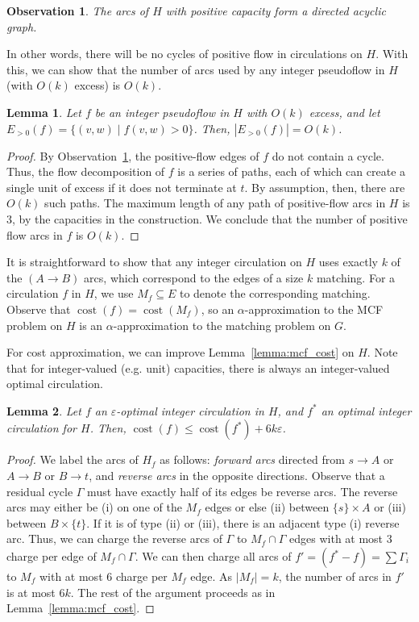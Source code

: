 \documentclass[11pt]{article}
\def\eps{\varepsilon}
\theoremstyle{plain}
\newtheorem{lemma}{Lemma}
\newtheorem{observation}{Observation}
\def\cost{\operatorname{cost}}
\begin{document}
\begin{observation}
\label{observation:dag}
	The arcs of $H$ with positive capacity form a directed acyclic graph.
\end{observation}

In other words, there will be no cycles of positive flow in circulations on
$H$.
With this, we can show that the number of arcs used by any integer pseudoflow
in $H$ (with $O(k)$ excess) is $O(k)$.

\begin{lemma}
\label{lemma:reduction_count}
Let $f$ be an integer pseudoflow in $H$ with $O(k)$ excess, and let
$E_{>0}(f) = \{(v, w) \mid f(v, w) > 0\}$.
Then, $|E_{>0}(f)| = O(k)$.
\end{lemma}

\begin{proof}
By Observation~\ref{observation:dag}, the positive-flow edges of $f$ do not
contain a cycle.
Thus, the flow decomposition of $f$ is a series of paths, each of which can
create a single unit of excess if it does not terminate at $t$.
By assumption, then, there are $O(k)$ such paths.
The maximum length of any path of positive-flow arcs in $H$ is 3, by the
capacities in the construction.
We conclude that the number of positive flow arcs in $f$ is $O(k)$.
\end{proof}

It is straightforward to show that any integer circulation on $H$ uses exactly
$k$ of the $(A \to B)$ arcs, which correspond to the edges of a size $k$
matching.
For a circulation $f$ in $H$, we use $M_f \subseteq E$ to denote the
corresponding matching.
Observe that $\cost(f) = \cost(M_f)$, so an $\alpha$-approximation to the MCF
problem on $H$ is an $\alpha$-approximation to the matching problem on $G$.

For cost approximation, we can improve Lemma~\ref{lemma:mcf_cost} on $H$.
Note that for integer-valued (e.g. unit) capacities, there is always an
integer-valued optimal circulation.
\begin{lemma}
\label{lemma:goldberg_cost_add}
Let $f$ an $\eps$-optimal integer circulation in $H$, and $f^*$ an optimal
integer circulation for $H$.
Then, $\cost(f) \leq \cost(f^*) + 6k\eps$.
\end{lemma}

\begin{proof}
We label the arcs of $H_f$ as follows: \emph{forward arcs} directed from
$s \to A$ or $A \to B$ or $B \to t$, and \emph{reverse arcs} in the opposite
directions.
Observe that a residual cycle $\Gamma$ must have exactly half of its edges be
reverse arcs.
The reverse arcs may either be (i) on one of the $M_f$ edges or else (ii)
between $\{s\} \times A$ or (iii) between $B \times \{t\}$.
If it is of type (ii) or (iii), there is an adjacent type (i) reverse arc.
Thus, we can charge the reverse arcs of $\Gamma$ to $M_f \cap \Gamma$ edges
with at most 3 charge per edge of $M_f \cap \Gamma$.
We can then charge all arcs of $f' = (f^* - f) = \sum \Gamma_i$ to $M_f$ with
at most 6 charge per $M_f$ edge.
As $|M_f| = k$, the number of arcs in $f'$ is at most $6k$.
The rest of the argument proceeds as in Lemma~\ref{lemma:mcf_cost}.
\end{proof}
\end{document}
